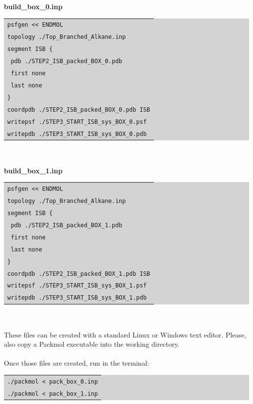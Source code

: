 \newline
\textbf{build\_box\_0.inp}\\
\colorbox{lightgray}{
\begin{tabular}{l}
\texttt{psfgen << ENDMOL}\\
\texttt{topology ./Top\_Branched\_Alkane.inp}\\
\texttt{segment ISB \{}\\
\texttt{    pdb ./STEP2\_ISB\_packed\_BOX\_0.pdb}\\
\texttt{    first none}\\
\texttt{    last none}\\
\texttt{\}}\\
\texttt{coordpdb ./STEP2\_ISB\_packed\_BOX\_0.pdb ISB}\\
\texttt{writepsf ./STEP3\_START\_ISB\_sys\_BOX\_0.psf}\\
\texttt{writepdb ./STEP3\_START\_ISB\_sys\_BOX\_0.pdb}\\
\end{tabular}}\\\\
\newline
\textbf{build\_box\_1.inp}\\
\colorbox{lightgray}{
\begin{tabular}{l}
\texttt{psfgen << ENDMOL}\\
\texttt{topology ./Top\_Branched\_Alkane.inp}\\
\texttt{segment ISB \{}\\
\texttt{    pdb ./STEP2\_ISB\_packed\_BOX\_1.pdb}\\
\texttt{    first none}\\
\texttt{    last none}\\
\texttt{\}}\\
\texttt{coordpdb ./STEP2\_ISB\_packed\_BOX\_1.pdb ISB}\\
\texttt{writepsf ./STEP3\_START\_ISB\_sys\_BOX\_1.psf}\\
\texttt{writepdb ./STEP3\_START\_ISB\_sys\_BOX\_1.pdb}\\
\end{tabular}}\\\\
These files can be created with a standard Linux or Windows text editor.  Please, also copy a Packmol executable into the working directory.\\\\
Once those files are created, run in the terminal:\\
\colorbox{lightgray}{
\begin{tabular}{l}
\texttt{./packmol < pack\_box\_0.inp}\\
\texttt{./packmol < pack\_box\_1.inp}\\
\end{tabular}}\\\\
